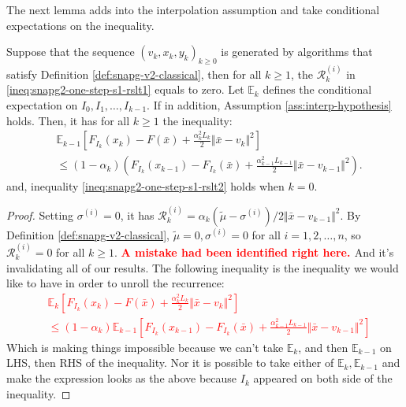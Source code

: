 \documentclass[12pt]{article}
\newcommand{\expect}{\ensuremath{\mathbb E}}
\begin{document}
    The next lemma adds into the interpolation assumption and take conditional expectations on the inequality. 
    \begin{lemma}\label{lemma:snapg-v2-one-step-not-scnvx}
        Suppose that the sequence $(v_k, x_k, y_k)_{k \ge 0}$ is generated by algorithms that satisfy Definition \ref{def:snapg-v2-classical}, then for all $k \ge 1$, the $\mathcal R^{(i)}_k$ in \eqref{ineq:snapg2-one-step-s1-rslt1} equals to zero. 
        Let $\mathbb E_k$ defines the conditional expectation on $I_0, I_1, \ldots, I_{k - 1}$. 
        If in addition, Assumption \ref{ass:interp-hypothesis} holds. 
        Then, it has for all $k \ge 1$ the inequality: 
        \begin{align*}
            & \expect_{k - 1}
            \left[
                F_{I_k}(x_k)
                - F(\bar x)
                + \frac{\alpha_k^2L_k}{2}\Vert \bar x - v_k\Vert^2
            \right]
            \\&\le 
            (1 - \alpha_k)\left(
                F_{I_k}(x_{k - 1}) - F_{I_k}(\bar x) + \frac{\alpha_{k - 1}^2L_{k - 1}}{2} \Vert \bar x - v_{k - 1}\Vert^2
            \right). 
        \end{align*}
        and, inequality \ref{ineq:snapg2-one-step-s1-rslt2} holds when $k = 0$. 
    \end{lemma}
    \begin{proof}
        Setting $\sigma^{(i)} = 0$, it has $\mathcal R^{(i)}_k = \alpha_k(\tilde \mu - \sigma^{(i)})/2\Vert \bar x - v_{k - 1}\Vert^2$. 
        By Definition \ref{def:snapg-v2-classical}, $\tilde \mu = 0, \sigma^{(i)} = 0$ for all $i = 1, 2, \ldots, n$, so $\mathcal R^{(i)}_k = 0$ for all $k \ge 1$. 
        \textbf{\textcolor{red}{A mistake had been identified right here. }} 
        And it's invalidating all of our results. 
        The following inequality is the inequality we would like to have in order to unroll the recurrence: 
        \textcolor{red}
        {
        \begin{align*}
            & \expect_{k}
            \left[
                F_{I_k}(x_k)
                - F(\bar x)
                + \frac{\alpha_k^2L_k}{2}\Vert \bar x - v_k\Vert^2
            \right]
            \\&\le 
            (1 - \alpha_k)
            \expect_{k - 1}
            \left[
                F_{I_k}(x_{k - 1}) - F_{I_k}(\bar x) + \frac{\alpha_{k - 1}^2L_{k - 1}}{2} \Vert \bar x - v_{k - 1}\Vert^2
            \right]
        \end{align*}
        }
        Which is making things impossible because we can't take $\expect_{k}$, and then $\expect_{k - 1}$ on LHS, then RHS of the inequality. 
        Nor it is possible to take either of $\expect_{k}, \expect_{k - 1}$ and make the expression looks as the above because $I_k$ appeared on both side of the inequality. 
    \end{proof}
\end{document}
